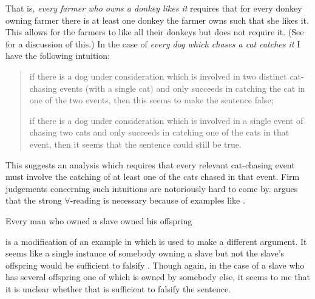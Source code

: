 That is,
\textit{every farmer who owns a donkey likes it} requires that for
every donkey owning farmer there is at least one donkey the farmer
owns such that she likes it.  This allows for the farmers to like all
their donkeys but does not require it. (See \citealp{Kanazawa1994} for
a discussion of this.)  In the case of \textit{every dog which chases
  a cat catches it} I have the following intuition:
\begin{quote}
  if there is a dog under consideration which is involved in two
  distinct cat-chasing events (with a single cat) and only succeeds in catching the cat in
  one of the two events, then this seems to make the sentence false;

  if there is a dog under consideration which is involved in a single
  event of chasing two cats and only succeeds in catching one of the
  cats in that event, then it seems that the sentence could still be
  true.
\end{quote}
This suggests an analysis which requires that every relevant
cat-chasing event must involve the catching of at least one of the
cats chased in that event.  Firm judgements concerning such intuitions
are notoriously hard to come by.  \cite{Chierchia1995} argues that the
strong $\forall$-reading is necessary because of examples like
\nexteg{}.
\begin{ex} 
Every man who owned a slave owned his offspring 
\end{ex} 
\preveg{} is a modification of an example in \cite{Heim1990} which is
used to make a different argument.  It seems like a single instance of
somebody owning a slave but not the slave's offspring would be
sufficient to falsify \preveg{}.  Though again, in the case of a slave
who has several offspring one of which is owned by somebody else, it
seems to me that it is unclear whether that is sufficient to falsify
the sentence.

